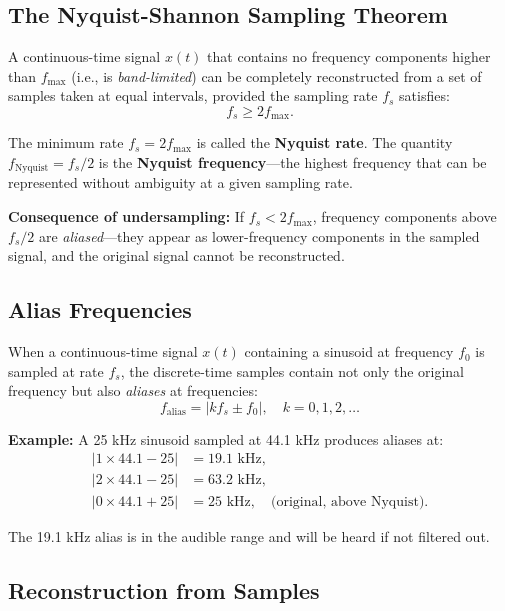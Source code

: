 \documentclass[11pt,letterpaper]{article}
\begin{document}
\subsection{The Nyquist-Shannon Sampling Theorem}

A continuous-time signal $x(t)$ that contains no frequency components higher than $f_{\text{max}}$ (i.e., is \textit{band-limited}) can be completely reconstructed from a set of samples taken at equal intervals, provided the sampling rate $f_s$ satisfies:
\begin{equation}
f_s \geq 2 f_{\text{max}}.
\end{equation}

The minimum rate $f_s = 2 f_{\text{max}}$ is called the \textbf{Nyquist rate}. The quantity $f_{\text{Nyquist}} = f_s / 2$ is the \textbf{Nyquist frequency}—the highest frequency that can be represented without ambiguity at a given sampling rate.

\textbf{Consequence of undersampling:} If $f_s < 2 f_{\text{max}}$, frequency components above $f_s / 2$ are \textit{aliased}—they appear as lower-frequency components in the sampled signal, and the original signal cannot be reconstructed.

\subsection{Alias Frequencies}

When a continuous-time signal $x(t)$ containing a sinusoid at frequency $f_0$ is sampled at rate $f_s$, the discrete-time samples contain not only the original frequency but also \textit{aliases} at frequencies:
\begin{equation}
f_{\text{alias}} = |k f_s \pm f_0|, \quad k = 0, 1, 2, \ldots
\end{equation}

\textbf{Example:} A 25 kHz sinusoid sampled at 44.1 kHz produces aliases at:
\begin{align}
|1 \times 44.1 - 25| &= 19.1 \text{ kHz},\\
|2 \times 44.1 - 25| &= 63.2 \text{ kHz},\\
|0 \times 44.1 + 25| &= 25 \text{ kHz}, \quad \text{(original, above Nyquist)}.
\end{align}

The 19.1 kHz alias is in the audible range and will be heard if not filtered out.

\subsection{Reconstruction from Samples}
\end{document}
